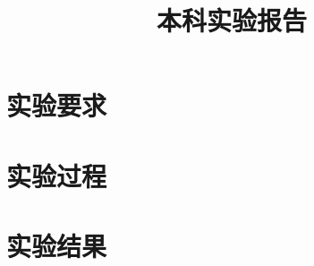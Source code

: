 \documentclass{sysureport}
\title{本科实验报告}
\date{\zhtoday}
\begin{document}
\makecover


\section{实验要求}
    
\section{实验过程}
    
\section{实验结果}
    
\end{document}
